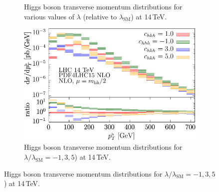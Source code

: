 \begin{figure}[htb]
 \begin{subfigure}{0.495\textwidth}
 \caption{Higgs boson transverse momentum distributions for various values of $\lambda$ (relative to $\lambda_{\mathrm{SM}}$)  at 14\,TeV.}
\label{fig:lambda_small_pTH}
\end{subfigure}
\hfill
\begin{subfigure}{0.495\textwidth}
    \includegraphics[width=\textwidth]{plots/NLO_cHHH_1_-1_3_5_ptH.pdf}
\caption{Higgs boson transverse momentum  distributions for $\lambda/\lambda_{\mathrm{SM}}=-1,3,5$)  at 14\,TeV.}
\label{fig:lambda_large_pTH}
\end{subfigure}
\label{fig:lambdavar14TeV_pTH}
\end{figure}


 
 

